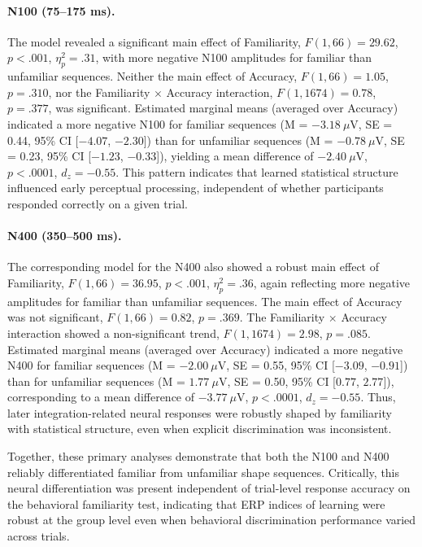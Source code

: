 \paragraph{N100 (75--175 ms).}
The model revealed a significant main effect of Familiarity, $F(1,66) = 29.62$, $p < .001$, $\eta_p^2 = .31$, with more negative N100 amplitudes for familiar than unfamiliar sequences. Neither the main effect of Accuracy, $F(1,66) = 1.05$, $p = .310$, nor the Familiarity $\times$ Accuracy interaction, $F(1,1674) = 0.78$, $p = .377$, was significant. Estimated marginal means (averaged over Accuracy) indicated a more negative N100 for familiar sequences (M = $-3.18~\mu$V, SE = 0.44, 95\% CI [$-4.07$, $-2.30$]) than for unfamiliar sequences (M = $-0.78~\mu$V, SE = 0.23, 95\% CI [$-1.23$, $-0.33$]), yielding a mean difference of $-2.40~\mu$V, $p < .0001$, $d_z = -0.55$. This pattern indicates that learned statistical structure influenced early perceptual processing, independent of whether participants responded correctly on a given trial.

\paragraph{N400 (350--500 ms).}
The corresponding model for the N400 also showed a robust main effect of Familiarity, $F(1,66) = 36.95$, $p < .001$, $\eta_p^2 = .36$, again reflecting more negative amplitudes for familiar than unfamiliar sequences. The main effect of Accuracy was not significant, $F(1,66) = 0.82$, $p = .369$. The Familiarity $\times$ Accuracy interaction showed a non-significant trend, $F(1,1674) = 2.98$, $p = .085$. Estimated marginal means (averaged over Accuracy) indicated a more negative N400 for familiar sequences (M = $-2.00~\mu$V, SE = 0.55, 95\% CI [$-3.09$, $-0.91$]) than for unfamiliar sequences (M = $1.77~\mu$V, SE = 0.50, 95\% CI [$0.77$, $2.77$]), corresponding to a mean difference of $-3.77~\mu$V, $p < .0001$, $d_z = -0.55$. Thus, later integration-related neural responses were robustly shaped by familiarity with statistical structure, even when explicit discrimination was inconsistent.

Together, these primary analyses demonstrate that both the N100 and N400 reliably differentiated familiar from unfamiliar shape sequences. Critically, this neural differentiation was present independent of trial-level response accuracy on the behavioral familiarity test, indicating that ERP indices of learning were robust at the group level even when behavioral discrimination performance varied across trials.

